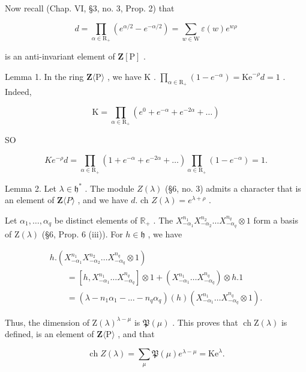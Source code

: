 Now recall (Chap. VI, §3, no. 3, Prop. 2) that

\[
d = \prod_ {\alpha \in \mathrm{R} _ {+}} (e ^ {\alpha / 2} - e ^ {- \alpha / 2}) = \sum_ {w \in \mathrm{W}} \varepsilon (w) e ^ {w \rho}
\]

is an anti-invariant element of \(\mathbf{Z}[\mathrm{P}]\) .

Lemma 1. In the ring \(\mathbf{Z}\langle \mathrm{P}\rangle\) , we have \(\mathrm{K}\) . \(\prod_{\alpha \in \mathrm{R}_{+}}(1 - e^{-\alpha}) = \mathrm{Ke}^{-\rho}d = 1\) . Indeed,

\[
\mathrm{K} = \prod_ {\alpha \in \mathrm{R} _ {+}} \left(e ^ {0} + e ^ {- \alpha} + e ^ {- 2 \alpha} + \dots\right)
\]

SO

\[
K e ^ {- \rho} d = \prod_ {\alpha \in \mathrm{R} _ {+}} \left(1 + e ^ {- \alpha} + e ^ {- 2 \alpha} + \dots\right) \prod_ {\alpha \in \mathrm{R} _ {+}} \left(1 - e ^ {- \alpha}\right) = 1.
\]

Lemma 2. Let \(\lambda \in \mathfrak{h}^*\) . The module \(Z(\lambda)\) (§6, no. 3) admits a character that is an element of \(\mathbf{Z}\langle P\rangle\) , and we have \(d.\) ch \(Z(\lambda) = e^{\lambda + \rho}\) .

Let \(\alpha_{1},\ldots ,\alpha_{q}\) be distinct elements of \(\mathbb{R}_+\) . The \(X_{-\alpha_1}^{n_1}X_{-\alpha_2}^{n_2}\dots X_{-\alpha_q}^{n_q}\otimes 1\) form a basis of \(\mathrm{Z}(\lambda)\) (§6, Prop. 6 (iii)). For \(h\in \mathfrak{h}\) , we have

\[
\begin{array}{l} h. (X _ {- \alpha_ {1}} ^ {n _ {1}} X _ {- \alpha_ {2}} ^ {n _ {2}} \ldots X _ {- \alpha_ {q}} ^ {n _ {q}} \otimes 1) \\ \qquad = [ h, X _ {- \alpha_ {1}} ^ {n _ {1}} \ldots X _ {- \alpha_ {q}} ^ {n _ {q}} ] \otimes 1 + (X _ {- \alpha_ {1}} ^ {n _ {1}} \ldots X _ {- \alpha_ {q}} ^ {n _ {q}}) \otimes h. 1 \\ \qquad = (\lambda - n _ {1} \alpha_ {1} - \dots - n _ {q} \alpha_ {q}) (h) (X _ {- \alpha_ {1}} ^ {n _ {1}} \ldots X _ {- \alpha_ {q}} ^ {n _ {q}} \otimes 1). \end{array}
\]

Thus, the dimension of \(\mathrm{Z}(\lambda)^{\lambda - \mu}\) is \(\mathfrak{P}(\mu)\) . This proves that \(\operatorname{ch} \mathrm{Z}(\lambda)\) is defined, is an element of \(\mathbf{Z}\langle \mathrm{P} \rangle\) , and that

\[
\operatorname{ch} Z (\lambda) = \sum_ {\mu} \mathfrak {P} (\mu) e ^ {\lambda - \mu} = \mathrm{Ke} ^ {\lambda}.
\]

